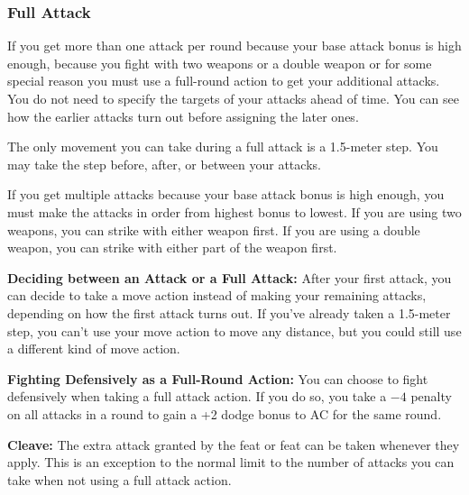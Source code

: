 \subsubsection{Full Attack}
If you get more than one attack per round because your base attack bonus is high enough, because you fight with two weapons or a double weapon or for some special reason you must use a full-round action to get your additional attacks. You do not need to specify the targets of your attacks ahead of time. You can see how the earlier attacks turn out before assigning the later ones.

The only movement you can take during a full attack is a 1.5-meter step. You may take the step before, after, or between your attacks.

If you get multiple attacks because your base attack bonus is high enough, you must make the attacks in order from highest bonus to lowest. If you are using two weapons, you can strike with either weapon first. If you are using a double weapon, you can strike with either part of the weapon first.

\textbf{Deciding between an Attack or a Full Attack:} After your first attack, you can decide to take a move action instead of making your remaining attacks, depending on how the first attack turns out. If you've already taken a 1.5-meter step, you can't use your move action to move any distance, but you could still use a different kind of move action.

\textbf{Fighting Defensively as a Full-Round Action:} You can choose to fight defensively when taking a full attack action. If you do so, you take a $-4$ penalty on all attacks in a round to gain a +2 dodge bonus to AC for the same round.

\textbf{Cleave:} The extra attack granted by the  feat or  feat can be taken whenever they apply. This is an exception to the normal limit to the number of attacks you can take when not using a full attack action.